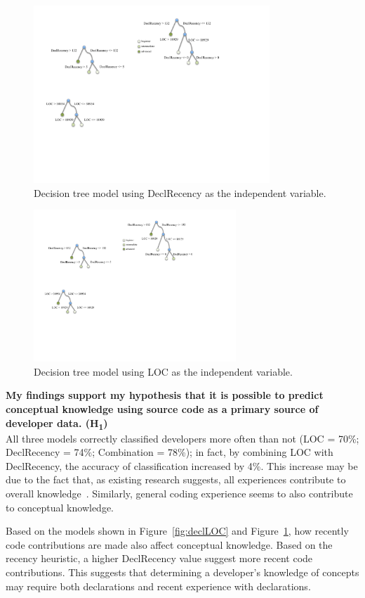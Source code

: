 \documentclass{llncs}
\begin{document}
\begin{figure} [h]
	\centering
	\includegraphics[width=3.5in]{figs/decl.pdf}
	\caption{Decision tree model using DeclRecency as the independent variable.}
	\label{fig:decl}
\end{figure}

\begin{figure} [h]
	\centering
	\includegraphics[width=3in]{figs/LOC.pdf}
	\caption{Decision tree model using LOC as the independent variable.}
	\label{fig:LOC}
\end{figure}

\noindent\textbf{My findings support my hypothesis that it is possible to predict conceptual knowledge using source code as a primary source of developer data. (H\textsubscript{1})}\\
All three models correctly classified developers more often than not (LOC = 70\%; DeclRecency = 74\%; Combination = 78\%); in fact, by combining LOC with DeclRecency, the accuracy of classification increased by 4\%. This increase may be due to the fact that, as existing research suggests, all experiences contribute to overall knowledge~\cite{argote2011organizational}. Similarly, general coding experience seems to also contribute to conceptual knowledge.

Based on the models shown in Figure~\ref{fig:declLOC} and Figure~\ref{fig:decl}, how recently code contributions are made also affect conceptual knowledge. Based on the recency heuristic, a higher DeclRecency value suggest more recent code contributions. This suggests that determining a developer's knowledge of concepts may require both declarations and recent experience with declarations. 
\end{document}
